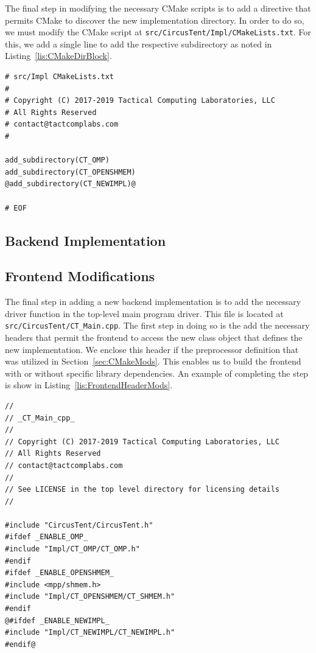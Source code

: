 \documentclass{article}
\begin{document}
The final step in modifying the necessary CMake scripts is to add a directive 
that permits CMake to discover the new implementation directory.  
In order to do so, we must modify the CMake script at 
\texttt{src/CircusTent/Impl/CMakeLists.txt}.  For this, we add a single line 
to add the respective subdirectory as noted in Listing~\ref{lis:CMakeDirBlock}.  

\vspace{0.125in}
\begin{lstlisting}[frame=single,style=base,caption={CMake Subdirectory Block},captionpos=b,label={lis:CMakeDirBlock}]
# src/Impl CMakeLists.txt
#
# Copyright (C) 2017-2019 Tactical Computing Laboratories, LLC
# All Rights Reserved
# contact@tactcomplabs.com
#

add_subdirectory(CT_OMP)
add_subdirectory(CT_OPENSHMEM)
@add_subdirectory(CT_NEWIMPL)@

# EOF
\end{lstlisting}

\clearpage
\subsection{Backend Implementation}
\label{sec:BackendImpl}

\clearpage
\subsection{Frontend Modifications}
\label{sec:FrontendMods}

The final step in adding a new backend implementation is to add the necessary 
driver function in the top-level main program driver.  This file is located 
at \texttt{src/CircusTent/CT\_Main.cpp}.  The first step in doing so is the add
the necessary headers that permit the frontend to access the new class object 
that defines the new implementation.  We enclose this header if the preprocessor 
definition that was utilized in Section~\ref{sec:CMakeMods}.  This enables us to build 
the frontend with or without specific library dependencies.  An example of completing 
the step is show in Listing~\ref{lis:FrontendHeaderMods}.  

\vspace{0.125in}
\begin{lstlisting}[frame=single,style=base,caption={Frontend Header Modifications},captionpos=b,label={lis:FrontendHeaderMods}]
//
// _CT_Main_cpp_
//
// Copyright (C) 2017-2019 Tactical Computing Laboratories, LLC
// All Rights Reserved
// contact@tactcomplabs.com
//
// See LICENSE in the top level directory for licensing details
//

#include "CircusTent/CircusTent.h"
#ifdef _ENABLE_OMP_
#include "Impl/CT_OMP/CT_OMP.h"
#endif
#ifdef _ENABLE_OPENSHMEM_
#include <mpp/shmem.h>
#include "Impl/CT_OPENSHMEM/CT_SHMEM.h"
#endif
@#ifdef _ENABLE_NEWIMPL_
#include "Impl/CT_NEWIMPL/CT_NEWIMPL.h"
#endif@
\end{lstlisting}
\end{document}
